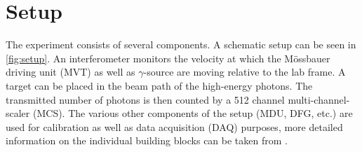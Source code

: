 
\section{Setup}
\label{sec:setup}

The experiment consists of several components. A schematic setup can be seen in 
\todo\autoref{fig:setup}. An interferometer monitors the velocity at which the Mössbauer 
driving unit (MVT) as well as $\gamma$-source are moving relative to the lab frame.
A target can be placed in the beam path of the high-energy photons. The transmitted
number of photons is then counted by a 512 channel multi-channel-scaler (MCS). The 
various other components of the setup (MDU, DFG, etc.) are used for calibration as 
well as data acquisition (DAQ) purposes, more detailed information on the individual
building blocks can be taken from \cite{Sch17}.
